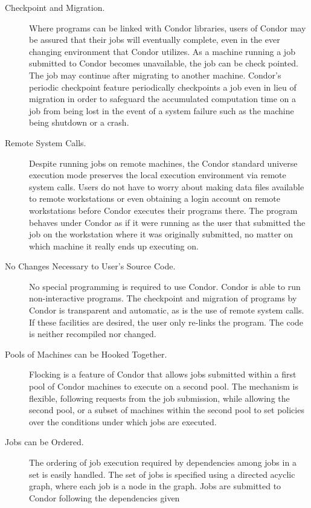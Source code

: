 \begin{description}
	\item[Checkpoint and Migration.] Where programs can be
linked with Condor libraries, users of Condor may be assured that
their jobs will eventually complete,
even in the ever changing environment that Condor
utilizes.
As a machine running a job submitted to Condor
becomes unavailable,
the job can be check pointed.
The job may continue after migrating 
to another machine.
Condor's periodic checkpoint feature 
periodically checkpoints a job even in lieu of migration in order to
safeguard the accumulated computation time on a job from being lost in the
event of a system failure such as the machine being shutdown or a crash.
	\item[Remote System Calls.] 
Despite running jobs on remote machines,
the Condor standard universe execution
mode preserves the local execution environment
via remote system calls. Users do not have to worry
about making data files available to remote workstations or even
obtaining a login account on remote workstations before Condor executes
their programs there. The program behaves under Condor as if it were
running as the user that submitted the job on the workstation where it
was originally submitted, no matter on which machine it really ends up
executing on.
	\item[No Changes Necessary to User's Source Code.] No special
programming is required to use Condor.
Condor is able to run non-interactive programs.
The checkpoint and migration of
programs by Condor is transparent and automatic, as is the use of
remote system calls.
If these facilities are desired, the user only
re-links the program.  The code is neither recompiled nor changed.
	\item[Pools of Machines can be Hooked Together.] Flocking is
a feature of Condor that allows jobs submitted within a first pool of
Condor machines to execute on a second pool.
The mechanism is flexible, following requests from the job
submission,
while allowing the second pool, or a subset of machines within
the second pool to set policies over the conditions under
which jobs are executed.
	\item[Jobs can be Ordered.] The ordering of job execution
required by dependencies among jobs in a set is easily handled.
The set of jobs is specified using a directed acyclic graph,
where each job is a node in the graph.
Jobs are submitted to Condor following the dependencies given

\end{description}
